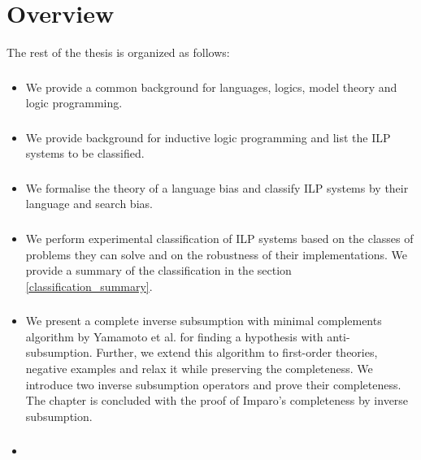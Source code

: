 \section{Overview}
The rest of the thesis is organized as follows:
\begin{itemize}
\item \subsubsection{} We provide a common background for languages, logics, model theory and logic programming.
\item \subsubsection{}
We provide background for inductive logic programming and list the ILP systems to be classified.
\item \subsubsection{}
We formalise the theory of a language bias and classify ILP systems by their language and search bias.
\item \subsubsection{}
We perform experimental classification of ILP systems based on the classes of problems they can solve and on the robustness of their implementations.
We provide a summary of the classification in the section \ref{classification_summary}.
\item \subsubsection{}
We present a complete inverse subsumption with minimal complements algorithm by Yamamoto et al. \cite{yamamoto2012inverse} for finding a hypothesis with anti-subsumption. Further, we extend this algorithm to first-order theories, negative examples and relax it while preserving the completeness. We introduce two inverse subsumption operators and prove their completeness. The chapter is concluded with the proof of Imparo's completeness by inverse subsumption.
\item \subsubsection{}

\end{itemize}
